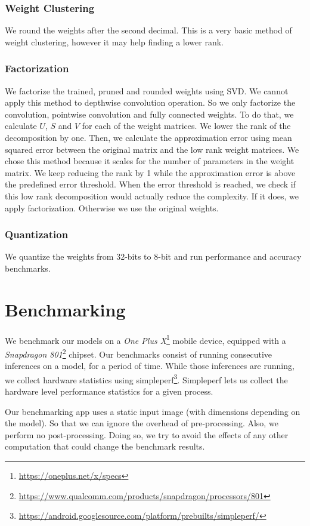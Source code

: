 \subsubsection{Weight Clustering}
We round the weights after the second decimal. This is a very basic method of weight clustering, however it may help finding a lower rank. 

\subsubsection{Factorization}
We factorize the trained, pruned and rounded weights using SVD. We cannot apply this method to depthwise convolution operation. So we only factorize the convolution, pointwise convolution and fully connected weights. To do that, we calculate $U$, $S$ and $V$ for each of the weight matrices. We lower the rank of the decomposition by one. Then, we calculate the approximation error using mean squared error between the original matrix and the low rank weight matrices. We chose this method because it scales for the number of parameters in the weight matrix. We keep reducing the rank by 1 while the approximation error is above the predefined error threshold. When the error threshold is reached, we check if this low rank decomposition would actually reduce the complexity. If it does, we apply factorization. Otherwise we use the original weights.

\subsubsection{Quantization}
We quantize the weights from 32-bits to 8-bit and run performance and accuracy benchmarks.

\iffalse
\section{Benchmarking}
We benchmark our models on a \textit{One Plus X}\footnote{\url{https://oneplus.net/x/specs}} mobile device, equipped with a \textit{Snapdragon 801}\footnote{\url{https://www.qualcomm.com/products/snapdragon/processors/801}} chipset. Our benchmarks consist of running consecutive inferences on a model, for a period of time. While those inferences are running, we collect hardware statistics using simpleperf\footnote{\url{https://android.googlesource.com/platform/prebuilts/simpleperf/}}. Simpleperf lets us collect the hardware level performance statistics for a given process.

Our benchmarking app uses a static input image (with dimensions depending on the model). So that we can ignore the overhead of pre-processing. Also, we perform no post-processing. Doing so, we try to avoid the effects of any other computation that could change the benchmark results. 

